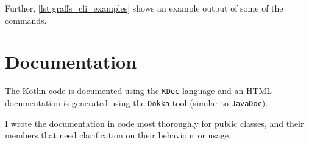Further, \autoref{lst:graffs_cli_examples} shows an example output of some of the commands.




\section{Documentation}

The Kotlin code is documented using the \texttt{KDoc} language and an HTML documentation is generated using the \texttt{Dokka} tool (similar to \texttt{JavaDoc}).\citeneeded

I wrote the documentation in code most thoroughly for public classes, and their members that need clarification on their behaviour or usage.


